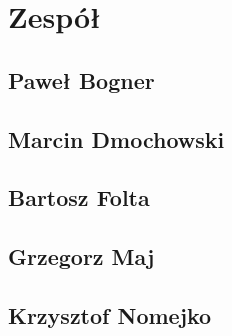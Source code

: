 \documentclass[11pt, a4paper]{article}
\begin{document}
	
	
	

%

	
	
	
	
	



	\section{Zespół}
		\subsection*{Paweł Bogner}
			
		\subsection*{Marcin Dmochowski}
			
		\subsection*{Bartosz Folta}
			
		\subsection*{Grzegorz Maj}
			
		\subsection*{Krzysztof Nomejko}
			
\end{document}
